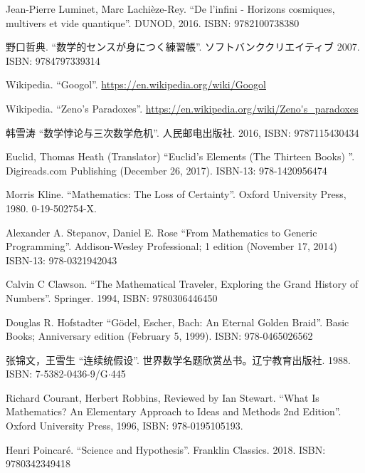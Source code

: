 \documentclass{article}
\begin{document}
\ifx\wholebook\relax \else
\begin{thebibliography}{99}

Jean-Pierre Luminet, Marc Lachièze-Rey. ``De l'infini - Horizons cosmiques, multivers et vide quantique''. DUNOD, 2016. ISBN: 9782100738380

{\fontspec{\cnmainft}野口哲典. ``数学的センスが身につく練習帳''. ソフトバンククリエイティブ} 2007. ISBN: 9784797339314

Wikipedia. ``Googol''. \url{https://en.wikipedia.org/wiki/Googol}

Wikipedia. ``Zeno's Paradoxes''. \url{https://en.wikipedia.org/wiki/Zeno's_paradoxes}

{\fontspec{\cnmainft}韩雪涛 ``数学悖论与三次数学危机''. 人民邮电出版社.} 2016, ISBN: 9787115430434

Euclid, Thomas Heath (Translator) ``Euclid's Elements (The Thirteen Books) ''. Digireads.com Publishing (December 26, 2017). ISBN-13: 978-1420956474

Morris Kline. ``Mathematics: The Loss of Certainty''. Oxford University Press, 1980. 0-19-502754-X.

Alexander A. Stepanov, Daniel E. Rose ``From Mathematics to Generic Programming''. Addison-Wesley Professional; 1 edition (November 17, 2014) ISBN-13: 978-0321942043

Calvin C Clawson. ``The Mathematical Traveler, Exploring the Grand History of Numbers''. Springer. 1994, ISBN: 9780306446450

Douglas R. Hofstadter ``Gödel, Escher, Bach: An Eternal Golden Braid''. Basic Books; Anniversary edition (February 5, 1999). ISBN: 978-0465026562

{\fontspec{\cnmainft}张锦文，王雪生 ``连续统假设''. 世界数学名题欣赏丛书。辽宁教育出版社.} 1988. ISBN: 7-5382-0436-9/G$\cdot$445

Richard Courant, Herbert Robbins, Reviewed by Ian Stewart. ``What Is Mathematics? An Elementary Approach to Ideas and Methods 2nd Edition''. Oxford University Press,  1996, ISBN: 978-0195105193.

Henri Poincaré. ``Science and Hypothesis''. Franklin Classics. 2018. ISBN: 9780342349418

\end{thebibliography}

\expandafter\enddocument

\fi
\end{document}
